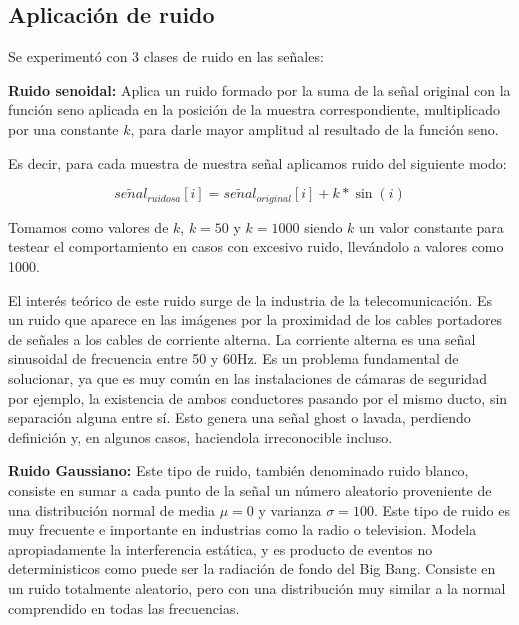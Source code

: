 \subsection{Aplicaci\'on de ruido}

Se experiment\'o con 3 clases de ruido en las se\~nales:

\begin{itemize}
	\begin{item} {\bf Ruido senoidal:} Aplica un ruido formado por la suma de la se\~nal
original con la funci\'on seno aplicada en la posici\'on de la muestra
correspondiente, multiplicado por una constante $k$, para darle mayor amplitud al resultado de
la funci\'on seno.

	Es decir, para cada muestra de nuestra se\~nal aplicamos ruido del siguiente
modo:

$$se\widetilde{n}al_{ruidosa}[i] = se\widetilde{n}al_{original}[i] + k * \sin(i)$$

  
Tomamos como valores de $k$, $k=50$ y $k=1000$ siendo $k$ un valor constante para testear el comportamiento en casos con excesivo ruido, llev\'andolo a valores
como 1000.

El inter\'es te\'orico de este ruido surge de la industria de la
telecomunicaci\'on. Es un ruido que aparece en las im\'agenes por la proximidad de los cables portadores de se\~nales a los cables de corriente alterna. La corriente alterna
es una se\~nal sinusoidal de frecuencia entre  50 y 60Hz. Es un problema fundamental de solucionar, ya que es muy com\'un en
las instalaciones de c\'amaras de seguridad por ejemplo, la existencia de ambos conductores pasando por el mismo ducto, sin separaci\'on
alguna entre s\'i. Esto genera una se\~nal ghost o lavada, perdiendo definici\'on y, en algunos casos, haciendola irreconocible incluso.
	\end{item}

	\begin{item}
		{\bf Ruido Gaussiano:} Este tipo de ruido, tambi\'en denominado ruido
blanco, consiste en sumar a cada punto de la se\~nal un n\'umero aleatorio
proveniente de una distribuci\'on normal de media $\mu = 0$ y varianza $\sigma=100$. 
Este tipo de ruido es muy frecuente e importante en industrias como la radio o television.
Modela apropiadamente la interferencia est\'atica, y es producto de eventos no deterministicos como 
puede ser la radiaci\'on de fondo del Big Bang. Consiste en un ruido totalmente aleatorio, pero con 
una distribuci\'on muy similar a la normal comprendido en todas las frecuencias.


\end{item}
\end{itemize}

